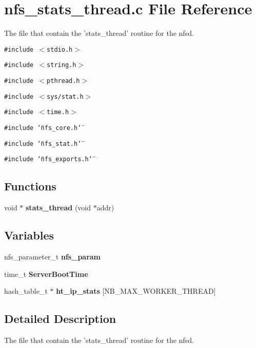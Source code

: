 \section{nfs\_\-stats\_\-thread.c File Reference}
\label{nfs__stats__thread_8c}
The file that contain the 'stats\_\-thread' routine for the nfsd. 

{\tt \#include $<$stdio.h$>$}\par
{\tt \#include $<$string.h$>$}\par
{\tt \#include $<$pthread.h$>$}\par
{\tt \#include $<$sys/stat.h$>$}\par
{\tt \#include $<$time.h$>$}\par
{\tt \#include \char`\"{}nfs\_\-core.h\char`\"{}}\par
{\tt \#include \char`\"{}nfs\_\-stat.h\char`\"{}}\par
{\tt \#include \char`\"{}nfs\_\-exports.h\char`\"{}}\par
\subsection*{Functions}
\begin{CompactItemize}
\item 
void $\ast$ {\bf stats\_\-thread} (void $\ast$addr)
\end{CompactItemize}
\subsection*{Variables}
\begin{CompactItemize}
\item 
nfs\_\-parameter\_\-t {\bf nfs\_\-param}
\item 
time\_\-t {\bf Server\-Boot\-Time}
\item 
hash\_\-table\_\-t $\ast$ {\bf ht\_\-ip\_\-stats} [NB\_\-MAX\_\-WORKER\_\-THREAD]
\end{CompactItemize}


\subsection{Detailed Description}
The file that contain the 'stats\_\-thread' routine for the nfsd. 

